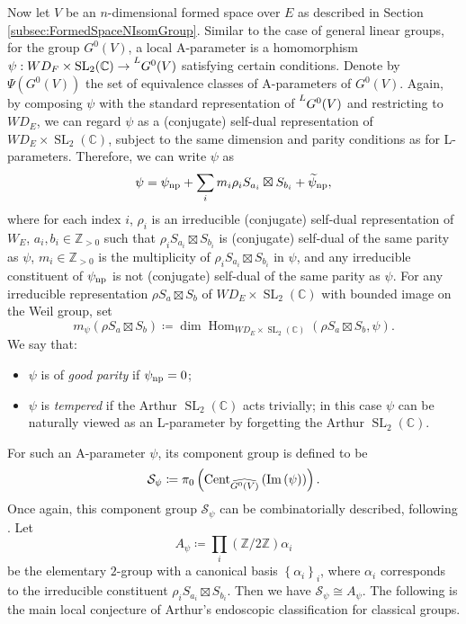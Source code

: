 \documentclass[11pt,letterpaper]{amsart}
\theoremstyle{plain}
\numberwithin{theorem}{section}
\numberwithin{equation}{subsection}
\theoremstyle{remark}
\newcommand{\Hom}{\operatorname{Hom}}
\newcommand{\SL}{\operatorname{SL}}
\newcommand{\C}{\mathbb{C}}
\newcommand{\Z}{\mathbb{Z}}
\def\calS{\mathcal{S}}
\def\ra{\rightarrow}
\def\np{{\rm np}} %
\begin{document}
Now let $V$ be an $n$-dimensional formed space over $E$ as described in Section \ref{subsec:FormedSpaceNIsomGroup}. Similar to the case of general linear groups, for the group $G^0(V)$, a local A-parameter is a homomorphism $\psi: WD_F\times \SL_2(\C) \ra \prescript{L}{}{G^0(V)}$ satisfying certain conditions. Denote by $\Psi\left(G^0(V)\right)$ the set of equivalence classes of A-parameters of $G^0(V)$. Again, by composing $\psi$ with the standard representation of $\prescript{L}{}{G^0(V)}$ and restricting to $WD_E$, we can regard $\psi$ as a (conjugate) self-dual representation of $WD_E\times \SL_2(\C)$, subject to the same dimension and parity conditions as for L-parameters. Therefore, we can write $\psi$ as
\[
    \psi = \psi_{\np} + \sum_i m_i\rho_iS_{a_i}\boxtimes S_{b_i} + \widetilde{\psi}_{\np},
\]
where for each index $i$, $\rho_i$ is an irreducible (conjugate) self-dual representation of $W_E$, $a_i,b_i\in\Z_{>0}$ such that $\rho_iS_{a_i}\boxtimes S_{b_i}$ is (conjugate) self-dual of the same parity as $\psi$, $m_i\in \Z_{>0}$ is the multiplicity of $\rho_iS_{a_i}\boxtimes S_{b_i}$ in $\psi$, and any irreducible constituent of $\psi_{\np}$ is not (conjugate) self-dual of the same parity as $\psi$. For any irreducible representation $\rho S_a\boxtimes S_b$ of $WD_E\times \SL_2(\C)$ with bounded image on the Weil group, set
\[
    m_\psi\left(\rho S_a\boxtimes S_b\right) \coloneqq \dim \Hom_{WD_E\times \SL_2(\C)}\left(\rho S_a\boxtimes S_b, \psi\right).
\]We say that:
\begin{itemize}
    \item $\psi$ is of \emph{good parity} if $\psi_{\np}=0$;

    \vskip 5pt

    \item $\psi$ is \emph{tempered} if the Arthur $\SL_2(\C)$ acts trivially; in this case $\psi$ can be naturally viewed as an L-parameter by forgetting the Arthur $\SL_2(\C)$.
\end{itemize}
\vskip 5pt
For such an A-parameter $\psi$, its component group is defined to be
\[
    \calS_\psi \coloneqq \pi_0\left({\rm Cent}_{\widehat{G^0(V)}}\left({\rm Im}\left(\psi\right)\right)\right).
\]
Once again, this component group $\calS_\psi$ can be combinatorially described, following \cite[Sect. 8]{MR3202556}. Let
\[
    A_\psi \coloneqq \prod_i \left(\Z/2\Z\right) \alpha_i
\]
be the elementary $2$-group with a canonical basis $\left\{\alpha_i\right\}_i$, where $\alpha_i$ corresponds to the irreducible constituent $\rho_iS_{a_i}\boxtimes S_{b_i}$. Then we have $\calS_\psi\cong A_\psi$. The following is the main local conjecture of Arthur's endoscopic classification for classical groups.
\end{document}
